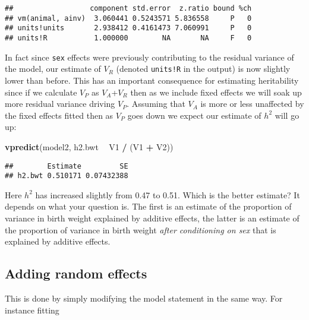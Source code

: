 \documentclass[12pt,]{book}
\newenvironment{Shaded}{\begin{snugshade}}{\end{snugshade}}
\newcommand{\KeywordTok}[1]{\textcolor[rgb]{0.13,0.29,0.53}{\textbf{#1}}}
\newcommand{\NormalTok}[1]{#1}
\newcommand{\OperatorTok}[1]{\textcolor[rgb]{0.81,0.36,0.00}{\textbf{#1}}}
\newcommand{\StringTok}[1]{\textcolor[rgb]{0.31,0.60,0.02}{#1}}
\begin{document}
\begin{verbatim}
##                  component std.error  z.ratio bound %ch
## vm(animal, ainv)  3.060441 0.5243571 5.836558     P   0
## units!units       2.938412 0.4161473 7.060991     P   0
## units!R           1.000000        NA       NA     F   0
\end{verbatim}

In fact since \texttt{sex} effects were previously contributing to the residual variance of the model, our estimate of \(V_R\) (denoted \texttt{units!R} in the output) is now slightly lower than before. This has an important consequence for estimating heritability since if we calculate \(V_P\) as \(V_A\)+\(V_R\) then as we include fixed effects we will soak up more residual variance driving \(V_P\). Assuming that \(V_A\) is more or less unaffected by the fixed effects fitted then as \(V_P\) goes down we expect our estimate of \(h^2\) will go up:

\begin{Shaded}
\begin{Highlighting}[]
\KeywordTok{vpredict}\NormalTok{(model2, h2.bwt }\OperatorTok{~}\StringTok{ }\NormalTok{V1 }\OperatorTok{/}\StringTok{ }\NormalTok{(V1 }\OperatorTok{+}\StringTok{ }\NormalTok{V2))}
\end{Highlighting}
\end{Shaded}

\begin{verbatim}
##        Estimate         SE
## h2.bwt 0.510171 0.07432388
\end{verbatim}

Here \(h^2\) has increased slightly from 0.47 to 0.51. Which is the better estimate? It depends on what your question is. The first is an estimate of the proportion of variance in birth weight explained by additive effects, the latter is an estimate of the proportion of variance in birth weight \emph{after conditioning on sex} that is explained by additive effects.

\hypertarget{adding-random-effects}{%
\subsection{Adding random effects}\label{adding-random-effects}}

This is done by simply modifying the model statement in the same way. For instance fitting
\end{document}
